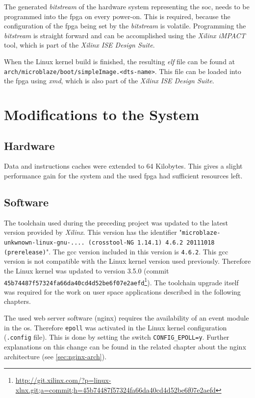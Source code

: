 The generated \textit{bitstream} of the hardware system representing the \gls{soc}, needs to be programmed into the \gls{fpga} on every power-on. This is required, because the configuration of the \gls{fpga} being set by the \textit{bitstream} is volatile. Programming the \textit{bitstream} is straight forward and can be accomplished using the \textit{Xilinx iMPACT} tool, which is part of the \textit{Xilinx ISE Design Suite}.

When the Linux kernel build is finished, the resulting \textit{\gls{elf}} file can be found at \texttt{arch/microblaze/boot/simpleImage.<dts-name>}. This file can be loaded into the \gls{fpga} using \textit{\gls{xmd}}, which is also part of the \textit{Xilinx ISE Design Suite}.

\chapter{Modifications to the System}

\section{Hardware}

Data and instructions caches were extended to 64 Kilobytes. This gives a slight performance gain for the system and the used \gls{fpga} had sufficient resources left.

\section{Software}

The toolchain used during the preceding project was updated to the latest version provided by \textit{Xilinx}. This version has the identifier "\texttt{microblaze-unkwnown-linux-gnu-.... (crosstool-NG 1.14.1) 4.6.2 20111018 (prerelease)}". The \gls{gcc} version included in this version is \texttt{4.6.2}. This \gls{gcc} version is not compatible with the Linux kernel version used previously. Therefore the Linux kernel was updated to version 3.5.0 (commit \texttt{45b74487f57324fa66da40cd4d52be6f07e2aefd}\footnote{\url{http://git.xilinx.com/?p=linux-xlnx.git;a=commit;h=45b74487f57324fa66da40cd4d52be6f07e2aefd}}). The toolchain upgrade itself was required for the work on user space applications described in the following chapters.

The used web server software (nginx) requires the availability of an event module in the \gls{os}. Therefore \texttt{epoll} was activated in the Linux kernel configuration (\texttt{.config} file). This is done by setting the switch \texttt{CONFIG\_EPOLL=y}. Further explanations on this change can be found in the related chapter about the nginx architecture (see \ref{sec:nginx-arch}).

